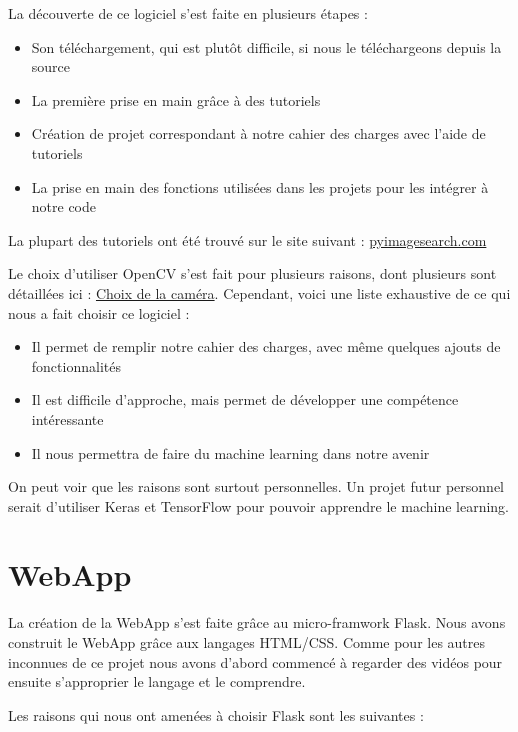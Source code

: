\documentclass[
	a4paper,									%
	11pt,										%
	twoside,									%
	openright,									%
	notitlepage,									%
	parskip=half,								%
]{scrreprt}										%
\begin{document}
La découverte de ce logiciel s'est faite en plusieurs étapes : 

\begin{itemize}
	\item Son téléchargement, qui est plutôt difficile, si nous le téléchargeons depuis la source
	\item La première prise en main grâce à des tutoriels
	\item Création de projet correspondant à notre cahier des charges avec l'aide de tutoriels
	\item La prise en main des fonctions utilisées dans les projets pour les intégrer à notre code
\end{itemize}

La plupart des tutoriels ont été trouvé sur le site suivant : \href{https://pyimagesearch.com/}{pyimagesearch.com} \par

Le choix d'utiliser OpenCV s'est fait pour plusieurs raisons, dont plusieurs sont détaillées ici : \href{run:./Choix_Camera.pdf}{Choix de la caméra}. 
Cependant, voici une liste exhaustive de ce qui nous a fait choisir ce logiciel :

\begin{itemize}
	\item Il permet de remplir notre cahier des charges, avec même quelques ajouts de fonctionnalités
	\item Il est difficile d'approche, mais permet de développer une compétence intéressante
	\item Il nous permettra de faire du machine learning dans notre avenir
\end{itemize}

On peut voir que les raisons sont surtout personnelles. Un projet futur personnel serait d'utiliser Keras et TensorFlow
pour pouvoir apprendre le machine learning. \par

\section{WebApp}

La création de la WebApp s'est faite grâce au micro-framwork Flask. Nous avons construit le WebApp grâce aux langages 
HTML/CSS. Comme pour les autres inconnues de ce projet nous avons d'abord commencé à regarder des vidéos pour ensuite
s'approprier le langage et le comprendre. \par

Les raisons qui nous ont amenées à choisir Flask sont les suivantes : 
\end{document}
